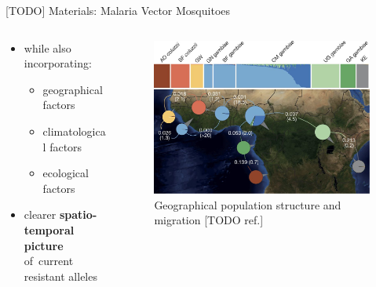 \documentclass[final,hyperref={pdfpagelabels=false}]{beamer}
\begin{document}
\begin{frame}[t]
\begin{columns}[t]
\begin{column}{.465\textwidth}
\begin{block}{[TODO] Materials: Malaria Vector Mosquitoes}
\begin{columns}
\begin{column}{.4\textwidth}
\begin{itemize}
    \item while also incorporating:
    \begin{itemize}
        \item geographical factors
    	\item climatological factors
    	\item ecological factors
    \end{itemize}
    
    \item clearer \textbf{spatio-temporal picture} of~current resistant alleles
\end{itemize}
\end{column}

\begin{column}{.6\textwidth} %
\centering

\begin{figure}
\includegraphics[width=.95\linewidth]{nature-mosquitoes/fig_2}
\caption{Geographical population structure and migration [TODO ref.]}
\end{figure}


\end{column}
\end{columns}
\end{block}
\end{column}
\end{columns}
\end{frame}
\end{document}

